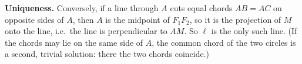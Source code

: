 \textbf{Uniqueness.} Conversely, if a line through $A$ cuts equal chords $AB=AC$ on opposite sides of $A$, then $A$ is the midpoint of $F_1F_2$, so it is the projection of $M$ onto the line, i.e.\ the line is perpendicular to $AM$. So $\ell$ is the only such line. (If the chords may lie on the same side of $A$, the common chord of the two circles is a second, trivial solution: there the two chords coincide.)

